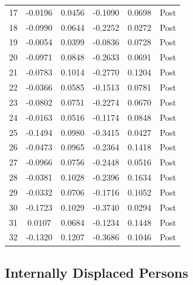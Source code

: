 \documentclass[bibtex]{article}
\begin{document}
{\begin{longtable}{cccccc}
17 & -0.0196 & 0.0456 & -0.1090 & 0.0698 & Post \\
18 & -0.0990 & 0.0644 & -0.2252 & 0.0272 & Post \\
19 & -0.0054 & 0.0399 & -0.0836 & 0.0728 & Post \\
20 & -0.0971 & 0.0848 & -0.2633 & 0.0691 & Post \\
21 & -0.0783 & 0.1014 & -0.2770 & 0.1204 & Post \\
22 & -0.0366 & 0.0585 & -0.1513 & 0.0781 & Post \\
23 & -0.0802 & 0.0751 & -0.2274 & 0.0670 & Post \\
24 & -0.0163 & 0.0516 & -0.1174 & 0.0848 & Post \\
25 & -0.1494 & 0.0980 & -0.3415 & 0.0427 & Post \\
26 & -0.0473 & 0.0965 & -0.2364 & 0.1418 & Post \\
27 & -0.0966 & 0.0756 & -0.2448 & 0.0516 & Post \\
28 & -0.0381 & 0.1028 & -0.2396 & 0.1634 & Post \\
29 & -0.0332 & 0.0706 & -0.1716 & 0.1052 & Post \\
30 & -0.1723 & 0.1029 & -0.3740 & 0.0294 & Post \\
31 & 0.0107 & 0.0684 & -0.1234 & 0.1448 & Post \\
32 & -0.1320 & 0.1207 & -0.3686 & 0.1046 & Post \\
\end{longtable}


\subsection{Internally Displaced Persons}

}
\end{document}
